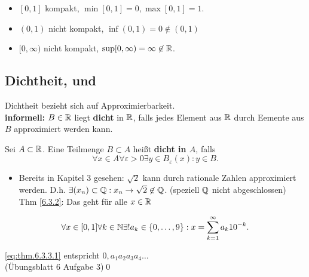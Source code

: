 \begingroup
\color{red}
\begin{itemize}
	\item $ [0, 1] $ kompakt, $ \min[0, 1] = 0, \max[0, 1] = 1 $.
	\item $ (0, 1) $ nicht kompakt, $ \inf(0, 1) = 0 \not\in (0, 1) $ 
	\item $ [0, \infty) $ nicht kompakt, $ \sup[0, \infty) = \infty \not\in \mathbb{R} $.
\end{itemize}
\endgroup

\subsection{Dichtheit,  und  }
Dichtheit bezieht sich auf Approximierbarkeit.\\
\textbf{informell:} $ B \in \mathbb{R} $ liegt \textbf{dicht} in $ \mathbb{R} $, falls jedes Element aus $ \mathbb{R} $ durch Eemente aus $ B $ approximiert werden kann.
\begin{subdefinition}
	Sei $ A \subset \mathbb{R} $. Eine Teilmenge $ B \subset A $ heißt \textbf{dicht in $ A $}, falls
	\[
	\forall x \in  A \forall  \varepsilon > 0 \exists  y \in B_{\varepsilon}(x): y \in B.
	\]
\end{subdefinition}

\begin{subtheorem}
	\begin{itemize}
		\item Bereits in Kapitel 3 gesehen: $ \sqrt{2} $ kann durch rationale Zahlen approximiert werden. D.h. $ \exists (x_n) \subset \mathbb{Q} : x_n \to \sqrt{2} \not\in \mathbb{Q} $. (speziell $ \mathbb{Q} $ nicht abgeschlossen) Thm \ref{6.3.2}: Das geht für alle $ x \in \mathbb{R} $
	\end{itemize}
\end{subtheorem}

\begin{subtheorem}[Dezimaldarstellungen]
	\begin{equation}
		\forall x \in [0, 1] \forall k \in \mathbb{N}  \exists ! a_k \in \left\{ 0, \dotsc, 9 \right\} : x = \sum_{k=1}^{\infty} a_k 10^{-k}.
		\label{eq:thm.6.3.3.1}
	\end{equation}
\end{subtheorem}

\begin{subproof*}[Satz 6.3.3]
	\ref{eq:thm.6.3.3.1} entspricht $ 0, a_1 a_2 a_3 a_4 \dotsc $\\
	(Übungsblatt 6 Aufgabe 3)\qed
\end{subproof*}


